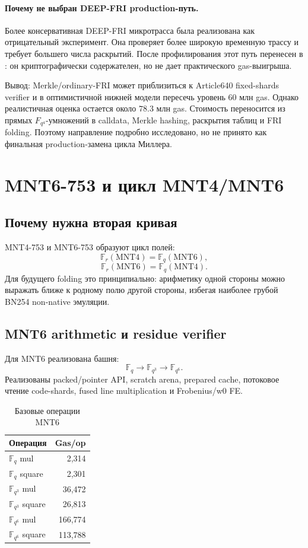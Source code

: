 \documentclass[12pt,a4paper]{article}
\newcommand{\Fq}{\mathbb{F}_q}
\newcommand{\Fr}{\mathbb{F}_r}
\newcommand{\code}[1]{\texttt{\detokenize{#1}}}
\begin{document}
\paragraph{Почему не выбран DEEP-FRI production-путь.}
Более консервативная DEEP-FRI микротрасса была реализована как отрицательный
эксперимент. Она проверяет более широкую временную трассу и требует большего
числа раскрытий. После профилирования этот путь перенесен в
\code{research_variants}: он криптографически содержателен, но не дает
практического gas-выигрыша.

Вывод: Merkle/ordinary-FRI может приблизиться к Article640 fixed-shards
verifier и в оптимистичной нижней модели пересечь уровень $60$ млн gas.
Однако реалистичная оценка остается около $78.3$ млн gas. Стоимость
переносится из прямых $F_{q^4}$-умножений в calldata, Merkle hashing,
раскрытия таблиц и FRI folding. Поэтому направление подробно исследовано,
но не принято как финальная production-замена цикла Миллера.

\section{MNT6-753 и цикл MNT4/MNT6}

\subsection{Почему нужна вторая кривая}

MNT4-753 и MNT6-753 образуют цикл полей:
\[
    \Fr(\mathrm{MNT4})=\Fq(\mathrm{MNT6}),
\]
\[
    \Fr(\mathrm{MNT6})=\Fq(\mathrm{MNT4}).
\]
Для будущего folding это принципиально: арифметику одной стороны можно
выражать ближе к родному полю другой стороны, избегая наиболее грубой
BN254 non-native эмуляции.

\subsection{MNT6 arithmetic и residue verifier}

Для MNT6 реализована башня:
\[
    \Fq\longrightarrow\mathbb{F}_{q^3}\longrightarrow\mathbb{F}_{q^6}.
\]
Реализованы packed/pointer API, scratch arena, prepared cache, потоковое чтение
code-shards, fused line multiplication и Frobenius/w0 FE.

\begin{table}[htbp]
\centering
\caption{Базовые операции MNT6}
\small
\begin{tabular}{l r}
\toprule
Операция & Gas/op \\
\midrule
$\Fq$ mul & 2,314 \\
$\Fq$ square & 2,301 \\
$\mathbb{F}_{q^3}$ mul & 36,472 \\
$\mathbb{F}_{q^3}$ square & 26,813 \\
$\mathbb{F}_{q^6}$ mul & 166,774 \\
$\mathbb{F}_{q^6}$ square & 113,788 \\
\bottomrule
\end{tabular}
\end{table}
\end{document}
